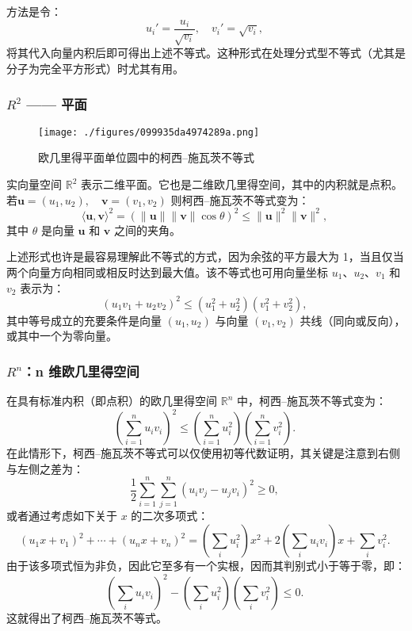 方法是令：
$$
u_i' = \frac{u_i}{\sqrt{v_i}}, \quad v_i' = \sqrt{v_i},~
$$
将其代入向量内积后即可得出上述不等式。这种形式在处理分式型不等式（尤其是分子为完全平方形式）时尤其有用。
\subsubsection{$R^2$ —— 平面}
\begin{figure}[ht]
\centering
\texttt{[image: ./figures/099935da4974289a.png]}
\caption{欧几里得平面单位圆中的柯西–施瓦茨不等式} \label{fig_KXSW_1}
\end{figure}
实向量空间 $\mathbb{R}^2$ 表示二维平面。它也是二维欧几里得空间，其中的内积就是点积。若$\mathbf{u} = (u_1, u_2),\quad \mathbf{v} = (v_1, v_2)$
则柯西–施瓦茨不等式变为：
$$
\langle \mathbf{u}, \mathbf{v} \rangle^2 = (\|\mathbf{u}\| \|\mathbf{v}\| \cos \theta)^2 \leq \|\mathbf{u}\|^2 \|\mathbf{v}\|^2,~
$$
其中 $\theta$ 是向量 $\mathbf{u}$ 和 $\mathbf{v}$ 之间的夹角。

上述形式也许是最容易理解此不等式的方式，因为余弦的平方最大为 1，当且仅当两个向量方向相同或相反时达到最大值。该不等式也可用向量坐标 $u_1$、$u_2$、$v_1$ 和 $v_2$ 表示为：
$$
(u_1 v_1 + u_2 v_2)^2 \leq (u_1^2 + u_2^2)(v_1^2 + v_2^2),~
$$
其中等号成立的充要条件是向量 $(u_1, u_2)$ 与向量 $(v_1, v_2)$ 共线（同向或反向），或其中一个为零向量。
\subsubsection{$R^n$：n 维欧几里得空间}
在具有标准内积（即点积）的欧几里得空间 $\mathbb{R}^n$ 中，柯西–施瓦茨不等式变为：
$$
\left( \sum_{i=1}^{n} u_i v_i \right)^2 \leq \left( \sum_{i=1}^{n} u_i^2 \right) \left( \sum_{i=1}^{n} v_i^2 \right).~
$$
在此情形下，柯西–施瓦茨不等式可以仅使用初等代数证明，其关键是注意到右侧与左侧之差为：
$$
\frac{1}{2} \sum_{i=1}^{n} \sum_{j=1}^{n} (u_i v_j - u_j v_i)^2 \geq 0,~
$$
或者通过考虑如下关于 $x$ 的二次多项式：
$$
(u_1 x + v_1)^2 + \cdots + (u_n x + v_n)^2 = \left( \sum_i u_i^2 \right) x^2 + 2 \left( \sum_i u_i v_i \right) x + \sum_i v_i^2.~
$$
由于该多项式恒为非负，因此它至多有一个实根，因而其判别式小于等于零，即：
$$
\left( \sum_i u_i v_i \right)^2 - \left( \sum_i u_i^2 \right) \left( \sum_i v_i^2 \right) \leq 0.~
$$
这就得出了柯西–施瓦茨不等式。
